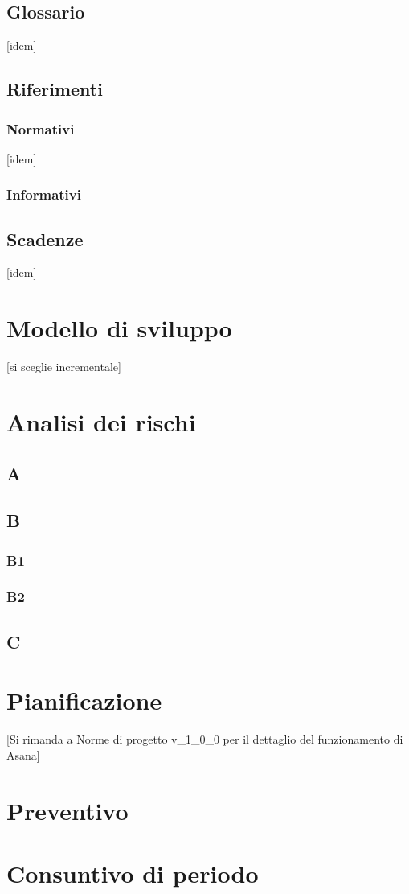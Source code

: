 	\subsection{Glossario}
	[idem]
	\subsection{Riferimenti}
		\subsubsection{Normativi}
		[idem]
		\subsubsection{Informativi}


	\subsection{Scadenze}
	[idem]

\section{Modello di sviluppo}
[si sceglie incrementale]


\section{Analisi dei rischi}
	\subsection{A}
	\subsection{B}
		\subsubsection{B1}
		\subsubsection{B2}
	\subsection{C}

\section{Pianificazione}
[Si rimanda a Norme di progetto v_1_0_0 per il dettaglio del funzionamento di Asana]
\section{Preventivo}
\section{Consuntivo di periodo}


